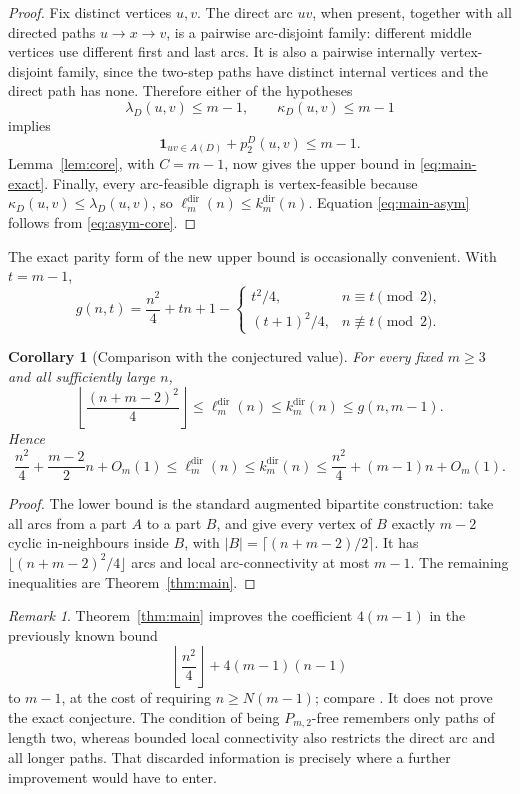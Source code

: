 \documentclass[10pt]{amsart}
\newtheorem{corollary}[theorem]{Corollary}
\theoremstyle{remark}
\newtheorem{remark}[theorem]{Remark}
\newcommand{\ind}{\mathbf 1}
\newcommand{\ldir}{\ell^{\mathrm{dir}}}
\newcommand{\kdir}{k^{\mathrm{dir}}}
\begin{document}
\begin{proof}
Fix distinct vertices $u,v$.  The direct arc $uv$, when present, together
with all directed paths $u\to x\to v$, is a pairwise arc-disjoint family:
different middle vertices use different first and last arcs.  It is also a
pairwise internally vertex-disjoint family, since the two-step paths have
distinct internal vertices and the direct path has none.  Therefore either
of the hypotheses
\[
 \lambda_D(u,v)\le m-1,
 \qquad
 \kappa_D(u,v)\le m-1
\]
implies
\[
 \ind_{uv\in A(D)}+p_2^D(u,v)\le m-1.
\]
Lemma~\ref{lem:core}, with $C=m-1$, now gives the upper bound in
\eqref{eq:main-exact}.  Finally, every arc-feasible digraph is
vertex-feasible because $\kappa_D(u,v)\le\lambda_D(u,v)$, so
$\ldir_m(n)\le\kdir_m(n)$.  Equation \eqref{eq:main-asym} follows from
\eqref{eq:asym-core}.
\end{proof}

The exact parity form of the new upper bound is occasionally convenient.
With $t=m-1$,
\[
 g(n,t)=\frac{n^2}{4}+tn+1-
 \begin{cases}
   t^2/4,&n\equiv t\pmod 2,\\[1mm]
   (t+1)^2/4,&n\not\equiv t\pmod 2.
 \end{cases}
\]

\begin{corollary}[Comparison with the conjectured value]
\label{cor:sandwich}
For every fixed $m\ge3$ and all sufficiently large $n$,
\begin{equation}
\label{eq:sandwich}
 \left\lfloor\frac{(n+m-2)^2}{4}\right\rfloor
 \le \ldir_m(n)\le\kdir_m(n)
 \le g(n,m-1).
\end{equation}
Hence
\[
 \frac{n^2}{4}+\frac{m-2}{2}n+O_m(1)
 \le \ldir_m(n)\le\kdir_m(n)
 \le \frac{n^2}{4}+(m-1)n+O_m(1).
\]
\end{corollary}

\begin{proof}
The lower bound is the standard augmented bipartite construction: take all
arcs from a part $A$ to a part $B$, and give every vertex of $B$ exactly
$m-2$ cyclic in-neighbours inside $B$, with
$|B|=\lceil(n+m-2)/2\rceil$.  It has
$\lfloor(n+m-2)^2/4\rfloor$ arcs and local arc-connectivity at most $m-1$.
The remaining inequalities are Theorem~\ref{thm:main}.
\end{proof}

\begin{remark}
Theorem~\ref{thm:main} improves the coefficient $4(m-1)$ in the previously
known bound
\[
 \left\lfloor\frac{n^2}{4}\right\rfloor+4(m-1)(n-1)
\]
to $m-1$, at the cost of requiring $n\ge N(m-1)$; compare
\cite[Theorems 1.11 and 1.12]{Vandenbruwaene}.  It does not prove the exact
conjecture.  The condition of being $P_{m,2}$-free remembers only paths of
length two, whereas bounded local connectivity also restricts the direct arc
and all longer paths.  That discarded information is precisely where a
further improvement would have to enter.
\end{remark}
\end{document}
